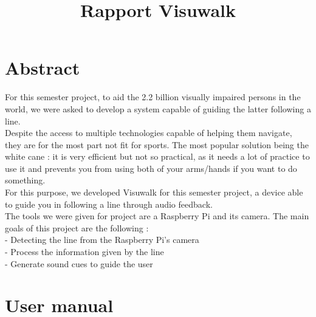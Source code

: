 \documentclass{rapport}
\title{Rapport Visuwalk} %
\begin{document}



        
\fairemarges %
\fairepagedegarde %
\tableofcontents%
\newpage

\section{Abstract}


For this semester project, to aid the 2.2 billion visually impaired persons in the world, we were asked to develop a system capable of guiding the latter following a line.\\ Despite the access to multiple technologies capable of helping them navigate, they are for the most part not fit for sports. The most popular solution being the white cane : it is very efficient but not so practical, as it needs a lot of practice to use it and prevents you from using both of your arms/hands if you want to do something.\\For this purpose, we developed Visuwalk for this semester project, a device able to guide you in following a line through audio feedback.\\
The tools we were given for project are a Raspberry Pi and its camera. The main goals of this project are the following :\\
- Detecting the line from the Raspberry Pi’s camera\\
- Process the information given by the line\\
- Generate sound cues to guide the user

\section {User manual}
\end{document}
